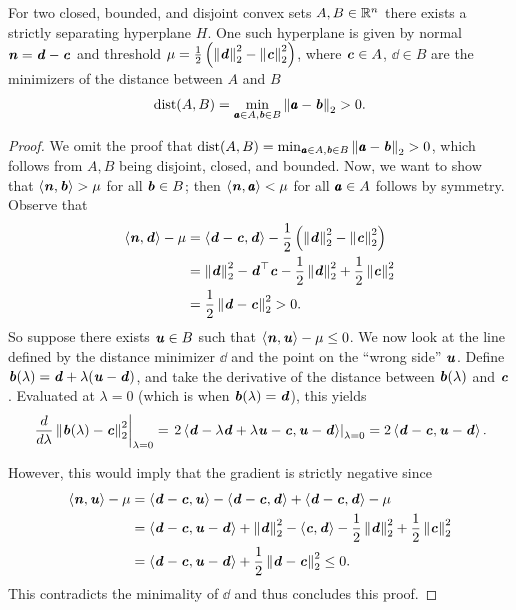 \begin{theorem} \label{th:shtcb}
For two closed, bounded, and disjoint convex sets $A, B \in \R^n$ there exists a strictly separating hyperplane $H$.
One such hyperplane is given by normal $\nn = \dd - \cc$ and threshold $\mu = \frac{1}{2}\left(\norm{\dd}_2^2 - \norm{\cc}_2^2\right)$, where $\cc \in A$, $\dd \in B$ are the minimizers of the distance between $A$ and $B$
\begin{equation*} \text{dist}(A, B) = \min_{\aa\in A, \bb \in B}\norm{\aa-\bb}_2 > 0.\end{equation*}
\end{theorem}
\begin{proof}
  We omit the proof that $\text{dist}(A, B) = \min_{\aa\in A, \bb \in
    B}\norm{\aa-\bb}_2 > 0$, which follows from $A,B$ being disjoint,
  closed, and bounded.
Now, we want to show that $\ip{\nn,\bb} > \mu$ for all $\bb \in B$; then $\ip{\nn,\aa} < \mu$ for all $\aa\in A$ follows by symmetry.
Observe that
\vspace{-1em}
\begin{align*}
  \ip{\nn, \dd} - \mu&= \ip{\dd-\cc,\dd} - \frac{1}{2}\left(\norm{\dd}_2^2-\norm{\cc}_2^2\right)\\
                    &= \norm{\dd}_2^2 - \dd^{\trp}\cc - \frac{1}{2}\norm{\dd}_2^2 + \frac{1}{2}\norm{\cc}_2^2 \\
										&= \frac{1}{2}\norm{\dd-\cc}_2^2 > 0.
\end{align*}
So suppose there exists $\uu \in B$ such that $\ip{\nn, \uu} - \mu \leq 0$.
We now look at the line defined by the distance minimizer $\dd$ and the point on the ``wrong side'' $\uu$.
Define $\bb(\lambda) = \dd + \lambda(\uu - \dd)$, and take the derivative of the distance between $\bb(\lambda)$ and $\cc$.
Evaluated at $\lambda=0$ (which is when $\bb(\lambda) = \dd$), this yields
\begin{equation*}
  \left.\frac{d}{d\lambda} \norm{\bb(\lambda) - \cc}_2^2\right\rvert_{\lambda=0} =
	\left.2\ip{\dd-\lambda\dd+\lambda\uu-\cc,\uu-\dd}\right\rvert_{\lambda=0} =
	2\ip{\dd-\cc, \uu-\dd}.
\end{equation*}

However, this would imply that the gradient is strictly negative since
\begin{align*}
\ip{\nn, \uu} - \mu & = \ip{\dd-\cc,\uu} - \ip{\dd-\cc,\dd} + \ip{\dd-\cc,\dd} - \mu \\
                  & = \ip{\dd-\cc,\uu-\dd} + \norm{\dd}_2^2 - \ip{\cc,\dd} - \frac{1}{2}\norm{\dd}_2^2+\frac{1}{2}\norm{\cc}_2^2 \\
                  & = \ip{\dd-\cc,\uu-\dd} + \frac{1}{2}\norm{\dd-\cc}_2^2 \leq 0.
\end{align*}
This contradicts the minimality of $\dd$ and thus concludes this proof.
\end{proof}

